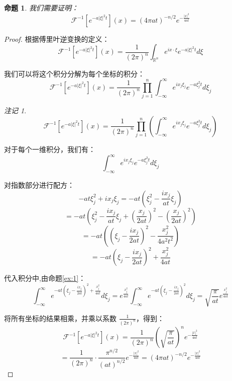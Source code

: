 \documentclass[12pt,a4paper]{article}
\numberwithin{subsection}{section}
\numberwithin{subsubsection}{subsection}
\theoremstyle{plain}
\newtheorem{proposition}[theorem]{命题}
\theoremstyle{definition}
\theoremstyle{remark}
\newtheorem{remark}[theorem]{注记}
\begin{document}
	\begin{proposition}
		我们需要证明：
		\[
		\mathcal{F}^{-1}\left[e^{-a|\xi|^2 t}\right](x) = (4\pi a t)^{-n/2} e^{-\frac{|x|^2}{4a t}}
		\]
	\end{proposition}
	
	
	
	\begin{proof}
		
		根据傅里叶逆变换的定义：
		\[
		\mathcal{F}^{-1}\left[e^{-a|\xi|^2 t}\right](x) = \frac{1}{(2\pi)^n} \int_{\mathbb{R}^n} e^{i x \cdot \xi} e^{-a|\xi|^2 t} d\xi
		\]
		
		我们可以将这个积分分解为每个坐标的积分：
		\[
		\mathcal{F}^{-1}\left[e^{-a|\xi|^2 t}\right](x) = \frac{1}{(2\pi)^n} \prod_{j=1}^n \int_{-\infty}^\infty e^{i x_j \xi_j} e^{-a\xi_j^2 t} d\xi_j
		\]
		
		\begin{remark}
			\[
			\mathcal{F}^{-1}\left[e^{-a|\xi|^{2} t}\right](x)=\frac{1}{(2\pi)^{n}}\prod_{j=1}^{n}\left(\int_{-\infty}^{\infty} e^{i x_j \xi_j} e^{-a\xi_j^{2} t} d\xi_j\right)
			\]
		\end{remark}
		
		
		对于每个一维积分，我们有：
		\[
		\int_{-\infty}^\infty e^{i x_j \xi_j} e^{-a\xi_j^2 t} d\xi_j
		\]
		
		对指数部分进行配方：
		\[
		-a t \xi_j^2 + i x_j \xi_j = -a t \left( \xi_j^2 - \frac{i x_j}{a t} \xi_j \right)
		\]
		\[
		= -a t \left( \xi_j^2 - \frac{i x_j}{a t} \xi_j + \left( \frac{x_j}{2a t} \right)^2 - \left( \frac{x_j}{2a t} \right)^2 \right)
		\]
		\[
		= -a t \left( \left( \xi_j - \frac{i x_j}{2a t} \right)^2 - \frac{x_j^2}{4a^2 t^2} \right)
		\]
		\[
		= -a t \left( \xi_j - \frac{i x_j}{2a t} \right)^2 + \frac{x_j^2}{4a t}
		\]
		
		代入积分中,由命题\eqref{ex:1}：
		\[
		\int_{-\infty}^\infty e^{-a t \left( \xi_j - \frac{i x_j}{2a t} \right)^2 + \frac{x_j^2}{4a t}} d\xi_j = e^{\frac{x_j^2}{4a t}} \int_{-\infty}^\infty e^{-a t \left( \xi_j - \frac{i x_j}{2a t} \right)^2} d\xi_j= \sqrt{\frac{\pi}{a t}} e^{\frac{x_j^2}{4a t}}
		\]
		
		
		将所有坐标的结果相乘，并乘以系数 \( \frac{1}{(2\pi)^n} \)，得到：
		\[
		\mathcal{F}^{-1}\left[e^{-a|\xi|^2 t}\right](x) = \frac{1}{(2\pi)^n} \left( \sqrt{\frac{\pi}{a t}} \right)^n e^{-\frac{|x|^2}{4a t}}
		\]
		\[
		= \frac{1}{(2\pi)^n} \cdot \frac{\pi^{n/2}}{(a t)^{n/2}} e^{-\frac{|x|^2}{4a t}} = (4\pi a t)^{-n/2} e^{-\frac{|x|^2}{4a t}}
		\]
		
	\end{proof}
	
\end{document}

